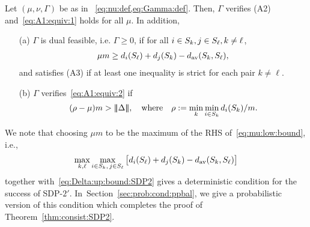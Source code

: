\begin{lem}\label{LEM:VALID:GAMMA:SDP2}
  Let $(\mu,\nu,\Gamma)$ be as in~ \cref{eq:nu:def,eq:Gamma:def}. Then, $\Gamma$ verifies (A2) and~\eqref{eq:A1:equiv:1} holds for all $\mu$. In addition,
  \begin{itemize}
  \setlength\itemsep{0em}
    \item[(a)] $\Gamma$ is dual feasible, i.e. $\Gamma \ge 0$, if for all $i\in S_{k}, j \in S_{\ell}, k \neq \ell$, 
    \begin{align}\label{eq:mu:low:bound}
      \mu m \ge d_{i}(S_{\ell})  + d_{j}(S_{k}) - d_{\text{av}}(S_{k},S_{\ell}),
    \end{align}
    and satisfies (A3) if at least one inequality is strict for each pair $k \neq \ell$.
    \item[(b)] $\Gamma$ verifies~\eqref{eq:A1:equiv:2} if
    \begin{align}\label{eq:Delta:up:bound:SDP2}
      (\rho - \mu) m > |\!|\!|\Delta|\!|\!|, \quad \text{where} \quad \rho := \min_k \min_{i \in S_{k}} d_{i}(S_{k}) /m.
    \end{align}

  \end{itemize}
\end{lem}

    We note that choosing $\mu m$ to be the maximum of the RHS of~\eqref{eq:mu:low:bound}, i.e.,
    \begin{align*}
      \max_{k,\ell} \max_{i \in S_{k},\, j \in S_{\ell}} \big[d_{i}(S_{\ell})  + d_{j}(S_{k}) - d_{\text{av}}(S_{k},S_{\ell})\big]
    \end{align*}
    together with~\eqref{eq:Delta:up:bound:SDP2} gives a deterministic condition for the success of SDP-$2'$. 
    In~Section~\ref{sec:prob:cond:ppbal}, we give a probabilistic version of this condition which completes the proof of Theorem~\ref{thm:consist:SDP2}.






